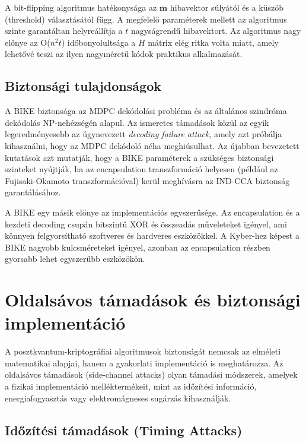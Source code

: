 A bit-flipping algoritmus hatékonysága az $\mathbf{m}$ hibavektor súlyától és a küszöb (threshold) 
választásától függ. A megfelelő paraméterek mellett az algoritmus szinte garantáltan helyreállítja 
a $t$ nagyságrendű hibavektort. Az algoritmus nagy előnye az O($n^2 t$) időbonyolultsága a $H$ 
mátrix elég ritka volta miatt, amely lehetővé teszi az ilyen nagyméretű kódok praktikus alkalmazását.

\subsection{Biztonsági tulajdonságok}

A BIKE biztonsága az MDPC dekódolási probléma és az általános szindróma dekódolás NP-nehézségén alapul. 
Az ismeretes támadások közül az egyik legeredményesebb az úgynevezett \emph{decoding failure attack}, 
amely azt próbálja kihasználni, hogy az MDPC dekódoló néha meghiúsulhat. Az újabban bevezetett 
kutatások azt mutatják, hogy a BIKE paraméterek a szükséges biztonsági szinteket nyújtják, 
ha az encapsulation transzformáció helyesen (például az Fujisaki-Okamoto transzformációval) 
kerül meghívásra az IND-CCA biztonság garantálásához.

A BIKE egy másik előnye az implementációs egyszerűsége. Az encapsulation és a kezdeti decoding 
csupán bitszintű XOR és összeadás műveleteket igényel, ami könnyen felgyorsítható szoftveres és hardveres 
eszközökkel. A Kyber-hez képest a BIKE nagyobb kulcsméreteket igényel, azonban az encapsulation 
részben gyorsabb lehet egyszerűbb eszközökön.


\section{Oldalsávos támadások és biztonsági implementáció}


A posztkvantum-kriptográfiai algoritmusok biztonságát nemcsak az elméleti matematikai 
alapjai, hanem a gyakorlati implementáció is meghatározza. Az oldalsávos támadások 
(side-channel attacks) olyan támadási módszerek, amelyek a fizikai implementáció 
melléktermékeit, mint az időzítési információ, energiafogyasztás vagy elektromágneses 
sugárzás kihasználják.

\subsection{Időzítési támadások (Timing Attacks)}

